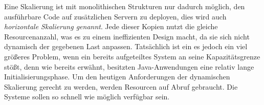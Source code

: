 Eine Skalierung ist mit monolithischen Strukturen nur dadurch möglich, den ausführbare Code auf zusätzlichen Servern zu deployen, dies wird auch \emph{horizontale Skalierung genannt}. Jede dieser Kopien nutzt die gleiche Resourcenanzahl, was es zu einem ineffizienten Design macht, da sie sich nicht dynamisch der gegebenen Last anpassen. Tatsächlich ist ein es jedoch ein viel größeres Problem, wenn ein bereits aufgeteiltes System an seine Kapazitätsgrenze stößt, denn wie bereits erwähnt, besitzten Java-Anwendungen eine relativ lange Initialisierungsphase. Um den heutigen Anforderungen der dynamischen Skalierung gerecht zu werden, werden Resourcen auf Abruf gebraucht. Die Systeme sollen so schnell wie möglich verfügbar sein. 
